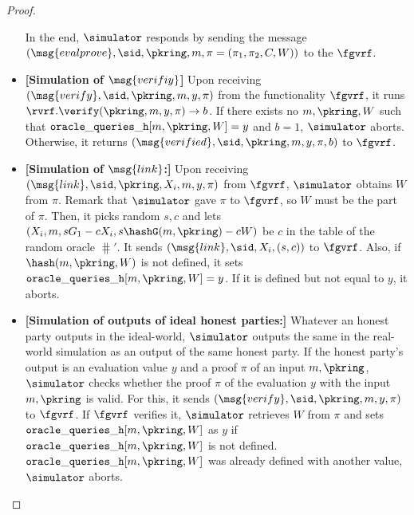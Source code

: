 \begin{proof}
\begin{itemize}
	 In the end, $ \simulator $  responds by sending the message $(\msg{evalprove}, \sid, \pkring, m, \pi = (\pi_1, \pi_2, C, W))$ to the $ \fgvrf $. 
	\item \textbf{[Simulation of $ \msg{verifiy} $]} Upon receiving  $(\msg{verify}, \sid, \pkring, m, y, \pi)$ from the functionality $\fgvrf$,  it runs $ \rvrf.\verify(\pkring, m, y, \pi) \rightarrow b $. If there exists no $ m, \pkring, W $ such that $ \mathtt{oracle\_queries\_h}[m, \pkring, W] = y $ and  $ b = 1  $, $ \simulator $ aborts. Otherwise, it returns $ (\msg{verified}, \sid, \pkring, m, y, \pi, b) $ to  $\fgvrf  $.
	\item \textbf{[Simulation of $ \msg{link} $:]} Upon receiving $(\msg{link}, \sid, \pkring, X_i, m, y, \pi)$ from $\fgvrf$, $ \simulator $ obtains $ W $ from $ \pi $. Remark that $ \simulator $ gave $ \pi $ to $ \fgvrf $, so $ W $ must be the part of $ \pi $. Then, it picks random $ s, c $ and lets $ (X_i, m, sG_1-cX_i, s\hashG(m, \pkring)- cW) $ be $ c $ in the table of the random oracle $ \hash' $. It sends $ (\msg{link}, \sid, X_i,(s,c)) $ to $ \fgvrf $. Also, if $ \hash(m,\pkring, W) $ is not defined, it sets $ \mathtt{oracle\_queries\_h}[m, \pkring, W] = y$. If it is defined but not equal to $ y $, it aborts.
	
	\item \textbf{[Simulation of outputs of ideal honest parties:]} Whatever an honest party outputs in the ideal-world, $ \simulator $ outputs the same in the real-world simulation as an output of the same honest party. If the honest party's output is an evaluation value $ y $ and a proof $ \pi $ of an input $ m, \pkring $, $ \simulator $ checks whether the proof $ \pi $ of the evaluation $ y $ with the input $ m, \pkring $ is valid. For this,
	it sends $ (\msg{verify}, \sid, \pkring, m, y, \pi) $ to $ \fgvrf $. If $ \fgvrf $ verifies it, $ \simulator $ retrieves $ W $ from $ \pi $ and sets $ \mathtt{oracle\_queries\_h}[m, \pkring, W] $ as $ y $ if $ \mathtt{oracle\_queries\_h}[m, \pkring, W] $ is not defined. $ \mathtt{oracle\_queries\_h}[m, \pkring, W] $ was already defined with another value, $ \simulator $ aborts. 
	\end{itemize}
	

\end{proof}
